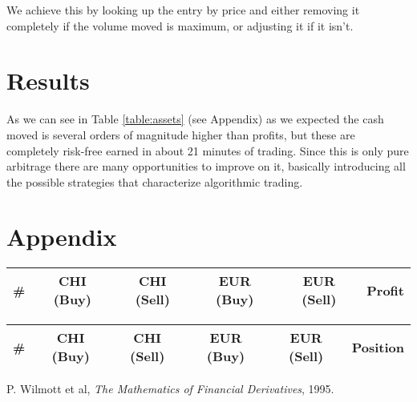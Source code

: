 \documentclass[8 pt]{article}
\begin{document}
\begin{multicols*}{2}
  We achieve this by looking up the entry by price and either removing it completely if the volume moved is maximum, or adjusting it if it isn't.

  \section{Results}

  As we can see in Table \ref{table:assets} (see Appendix) as we expected the cash moved is several orders of magnitude higher than profits, but these are completely risk-free earned in about 21 minutes of trading. Since this is only pure arbitrage there are many opportunities to improve on it, basically introducing all the possible strategies that characterize algorithmic trading.

\section{Appendix}

\begin{minipage}{\textwidth}
\begin{center}
  \Large
  \label{table:cash}
  \begin{tabular}{|c|c|c|c|c|c|}
    \hline
    \# & CHI (Buy) & CHI (Sell) & EUR (Buy) & EUR (Sell) & Profit \\ \hline
    
  \end{tabular}
\end{center}

\vspace{1.0cm}

\begin{center}
  \Large
  \label{table:assets}
  \begin{tabular}{|c|c|c|c|c|c|}
    \hline
    \# & CHI (Buy) & CHI (Sell) & EUR (Buy) & EUR (Sell) & Position \\ \hline
    
  \end{tabular}
\end{center}
\end{minipage}

\begin{thebibliography}{28}
\raggedright
{}

 P. Wilmott et al, \emph{The Mathematics of Financial Derivatives}, 1995.

\end{thebibliography}

\end{multicols*}
\end{document}
